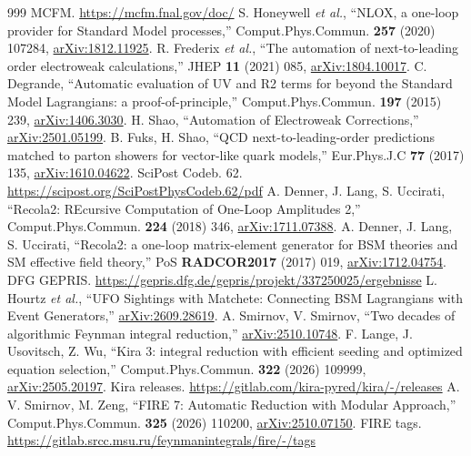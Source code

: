 \documentclass[a4paper,10pt]{ltjsarticle}
\begin{document}
\begin{thebibliography}{999}
 MCFM. \url{https://mcfm.fnal.gov/doc/}
 S. Honeywell \textit{et al.}, ``NLOX, a one-loop provider for Standard Model processes,'' Comput.Phys.Commun. \textbf{257} (2020) 107284, \href{https://arxiv.org/abs/1812.11925}{arXiv:1812.11925}.
 R. Frederix \textit{et al.}, ``The automation of next-to-leading order electroweak calculations,'' JHEP \textbf{11} (2021) 085, \href{https://arxiv.org/abs/1804.10017}{arXiv:1804.10017}.
 C. Degrande, ``Automatic evaluation of UV and R2 terms for beyond the Standard Model Lagrangians: a proof-of-principle,'' Comput.Phys.Commun. \textbf{197} (2015) 239, \href{https://arxiv.org/abs/1406.3030}{arXiv:1406.3030}.
 H. Shao, ``Automation of Electroweak Corrections,'' \href{https://arxiv.org/abs/2501.05199}{arXiv:2501.05199}.
 B. Fuks, H. Shao, ``QCD next-to-leading-order predictions matched to parton showers for vector-like quark models,'' Eur.Phys.J.C \textbf{77} (2017) 135, \href{https://arxiv.org/abs/1610.04622}{arXiv:1610.04622}.
 SciPost Codeb. 62. \url{https://scipost.org/SciPostPhysCodeb.62/pdf}
 A. Denner, J. Lang, S. Uccirati, ``Recola2: REcursive Computation of One-Loop Amplitudes 2,'' Comput.Phys.Commun. \textbf{224} (2018) 346, \href{https://arxiv.org/abs/1711.07388}{arXiv:1711.07388}.
 A. Denner, J. Lang, S. Uccirati, ``Recola2: a one-loop matrix-element generator for BSM theories and SM effective field theory,'' PoS \textbf{RADCOR2017} (2017) 019, \href{https://arxiv.org/abs/1712.04754}{arXiv:1712.04754}.
 DFG GEPRIS. \url{https://gepris.dfg.de/gepris/projekt/337250025/ergebnisse}
 L. Hourtz \textit{et al.}, ``UFO Sightings with Matchete: Connecting BSM Lagrangians with Event Generators,'' \href{https://arxiv.org/abs/2609.28619}{arXiv:2609.28619}.
 A. Smirnov, V. Smirnov, ``Two decades of algorithmic Feynman integral reduction,'' \href{https://arxiv.org/abs/2510.10748}{arXiv:2510.10748}.
 F. Lange, J. Usovitsch, Z. Wu, ``Kira 3: integral reduction with efficient seeding and optimized equation selection,'' Comput.Phys.Commun. \textbf{322} (2026) 109999, \href{https://arxiv.org/abs/2505.20197}{arXiv:2505.20197}.
 Kira releases. \url{https://gitlab.com/kira-pyred/kira/-/releases}
 A. V. Smirnov, M. Zeng, ``FIRE 7: Automatic Reduction with Modular Approach,'' Comput.Phys.Commun. \textbf{325} (2026) 110200, \href{https://arxiv.org/abs/2510.07150}{arXiv:2510.07150}.
 FIRE tags. \url{https://gitlab.srcc.msu.ru/feynmanintegrals/fire/-/tags}

\end{thebibliography}
\end{document}
